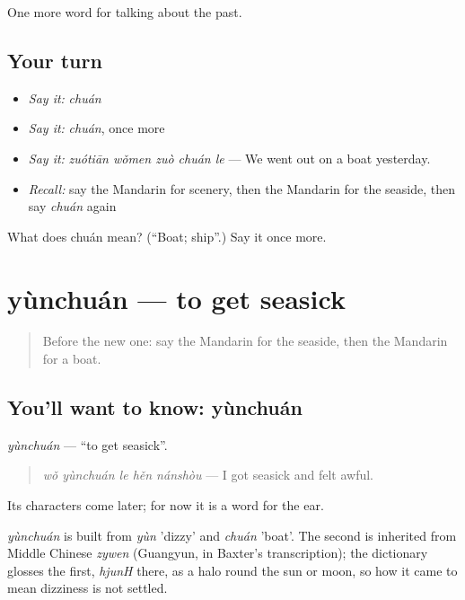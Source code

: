 \begin{grammarlens}[title={What you've built}]
One more word for talking about the past.
\end{grammarlens}

\subsection*{Your turn}
\begin{itemize}
\raggedright
  \item \emph{Say it:} \emph{chuán}
  \item \emph{Say it:} \emph{chuán}, once more
  \item \emph{Say it:} \emph{zuótiān wǒmen zuò chuán le} — We went out on a boat yesterday.
  \item \emph{Recall:} say the Mandarin for scenery, then the Mandarin for the seaside, then say \emph{chuán} again
\end{itemize}

\begin{tcolorbox}[breakable,colback=teal!4,colframe=teal!35!black,title={Before you move on}]
What does chuán mean? (\textquotedblleft{}Boat; ship\textquotedblright{}.) Say it once more.
\end{tcolorbox}
\section[yùnchuán]{yùnchuán — to get seasick}

\label{lesson:ZH-C227-yunchuan}



\begin{quote}
Before the new one: say the Mandarin for the seaside, then the Mandarin for a boat.
\end{quote}

\subsection*{You'll want to know: yùnchuán}
\emph{yùnchuán} — \textquotedblleft{}to get seasick\textquotedblright{}.

\begin{quote}
\emph{wǒ yùnchuán le hěn nánshòu} — I got seasick and felt awful.
\end{quote}

Its characters come later; for now it is a word for the ear.

\begin{cousinweb}
\emph{yùnchuán} is built from \emph{yùn} 'dizzy' and \emph{chuán} 'boat'. The second is inherited from Middle Chinese \emph{zywen} (Guangyun, in Baxter's transcription); the dictionary glosses the first, \emph{hjunH} there, as a halo round the sun or moon, so how it came to mean dizziness is not settled.
\end{cousinweb}


